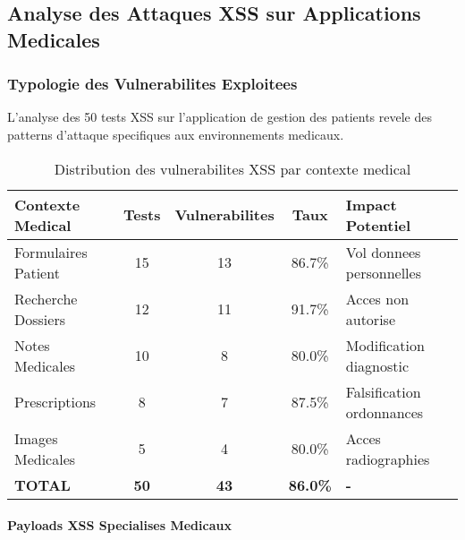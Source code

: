 \subsection{Analyse des Attaques XSS sur Applications Medicales}

\subsubsection{Typologie des Vulnerabilites Exploitees}

L'analyse des 50 tests XSS sur l'application de gestion des patients revele des patterns d'attaque specifiques aux environnements medicaux.

\begin{table}[H]
    \centering
    \caption{Distribution des vulnerabilites XSS par contexte medical}
    \begin{tabular}{|l|c|c|c|l|}
        \hline
        \textbf{Contexte Medical} & \textbf{Tests} & \textbf{Vulnerabilites} & \textbf{Taux}   & \textbf{Impact Potentiel} \\
        \hline
        Formulaires Patient       & 15             & 13                      & 86.7\%          & Vol donnees personnelles  \\
        \hline
        Recherche Dossiers        & 12             & 11                      & 91.7\%          & Acces non autorise        \\
        \hline
        Notes Medicales           & 10             & 8                       & 80.0\%          & Modification diagnostic   \\
        \hline
        Prescriptions             & 8              & 7                       & 87.5\%          & Falsification ordonnances \\
        \hline
        Images Medicales          & 5              & 4                       & 80.0\%          & Acces radiographies       \\
        \hline
        \textbf{TOTAL}            & \textbf{50}    & \textbf{43}             & \textbf{86.0\%} & \textbf{-}                \\
        \hline
    \end{tabular}
\end{table}

\paragraph{Payloads XSS Specialises Medicaux}

